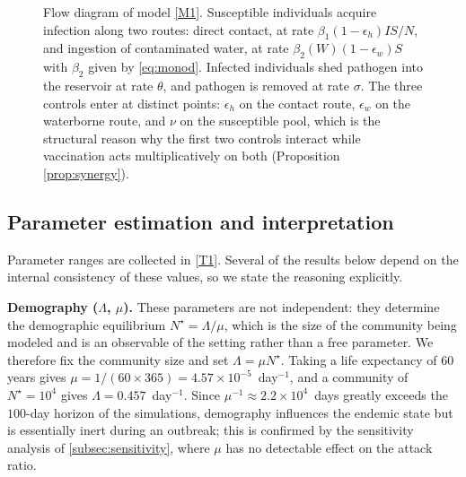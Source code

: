 \documentclass[11pt]{article}
\theoremstyle{plain}
\theoremstyle{definition}
\theoremstyle{remark}
\begin{document}
\begin{figure}[!htbp]
\centering
{}
\caption{Flow diagram of model \eqref{M1}. Susceptible individuals acquire infection along two routes: direct contact, at rate $\beta_1(1-\epsilon_h)IS/N$, and ingestion of contaminated water, at rate $\beta_2(W)(1-\epsilon_w)S$ with $\beta_2$ given by \eqref{eq:monod}. Infected individuals shed pathogen into the reservoir at rate $\theta$, and pathogen is removed at rate $\sigma$. The three controls enter at distinct points: $\epsilon_h$ on the contact route, $\epsilon_w$ on the waterborne route, and $\nu$ on the susceptible pool, which is the structural reason why the first two controls interact while vaccination acts multiplicatively on both (Proposition \ref{prop:synergy}).}
\label{flowchart}
\end{figure}

\subsection{Parameter estimation and interpretation}\label{subsec:params}

Parameter ranges are collected in \cref{T1}. Several of the results below depend on the internal consistency of these values, so we state the reasoning explicitly.

\textbf{Demography ($\Lambda$, $\mu$).} These parameters are not independent: they determine the demographic equilibrium $N^\star=\Lambda/\mu$, which is the size of the community being modeled and is an observable of the setting rather than a free parameter. We therefore fix the community size and set $\Lambda=\mu N^\star$. Taking a life expectancy of $60$ years gives $\mu=1/(60\times365)=4.57\times10^{-5}$~day$^{-1}$, and a community of $N^\star=10^4$ gives $\Lambda=0.457$~day$^{-1}$. Since $\mu^{-1}\approx2.2\times10^4$~days greatly exceeds the $100$-day horizon of the simulations, demography influences the endemic state but is essentially inert during an outbreak; this is confirmed by the sensitivity analysis of \cref{subsec:sensitivity}, where $\mu$ has no detectable effect on the attack ratio.
\end{document}

